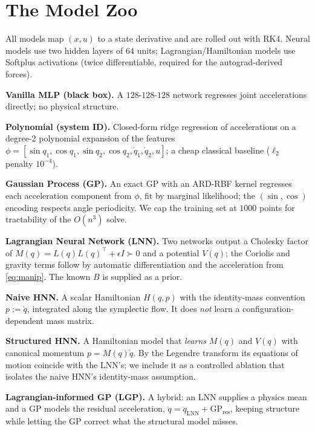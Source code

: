 \documentclass[conference]{IEEEtran}
\begin{document}
\section{The Model Zoo}
All models map $(x,u)$ to a state derivative and are rolled out with RK4. Neural
models use two hidden layers of $64$ units; Lagrangian/Hamiltonian models use
Softplus activations (twice differentiable, required for the autograd-derived
forces).

\textbf{Vanilla MLP (black box).} A $128$-$128$-$128$ network regresses joint
accelerations directly; no physical structure.

\textbf{Polynomial (system ID).} Closed-form ridge regression of accelerations on
a degree-2 polynomial expansion of the features
$\phi=[\sin q_1,\cos q_1,\sin q_2,\cos q_2,\dot q_1,\dot q_2,u]$; a cheap classical
baseline ($\ell_2$ penalty $10^{-4}$).

\textbf{Gaussian Process (GP).} An exact GP with an ARD-RBF kernel regresses each
acceleration component from $\phi$, fit by marginal likelihood; the $(\sin,\cos)$
encoding respects angle periodicity. We cap the training set at $1000$ points for
tractability of the $O(n^3)$ solve.

\textbf{Lagrangian Neural Network (LNN).} Two networks output a Cholesky factor of
$M(q)=L(q)L(q)^\top+\epsilon I\succ 0$ and a potential $V(q)$; the Coriolis and
gravity terms follow by automatic differentiation and the acceleration from
\eqref{eq:manip}. The known $B$ is supplied as a prior.

\textbf{Naive HNN.} A scalar Hamiltonian $H(q,p)$ with the identity-mass
convention $p:=\dot q$, integrated along the symplectic flow. It does \emph{not}
learn a configuration-dependent mass matrix.

\textbf{Structured HNN.} A Hamiltonian model that \emph{learns} $M(q)$ and $V(q)$
with canonical momentum $p=M(q)\dot q$. By the Legendre transform its equations of
motion coincide with the LNN's; we include it as a controlled ablation that
isolates the naive HNN's identity-mass assumption.

\textbf{Lagrangian-informed GP (LGP).} A hybrid: an LNN supplies a physics mean
and a GP models the residual acceleration, $\ddot q = \ddot q_{\mathrm{LNN}} +
\mathrm{GP}_{\mathrm{res}}$, keeping structure while letting the GP correct what
the structural model misses.
\end{document}
